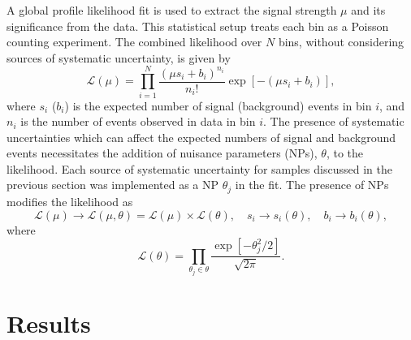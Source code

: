 

A global profile likelihood fit is used to extract the signal strength $\mu$ and its significance from the data. This statistical setup treats each bin as a Poisson counting experiment. The combined likelihood over $N$ bins, without considering sources of systematic uncertainty, is given by
%
\begin{equation}
    \mathcal{L}(\mu) = \prod_{i=1}^N \frac{(\mu s_i + b_i)^{n_i}}{n_i!} \exp \left[ - (\mu s_i + b_i) \right],
\end{equation}
%
where $s_i$ ($b_i$) is the expected number of signal (background) events in bin $i$, and $n_i$ is the number of events observed in data in bin $i$. The presence of systematic uncertainties which can affect the expected numbers of signal and background events necessitates the addition of nuisance parameters (NPs), $\theta$, to the likelihood. Each source of systematic uncertainty for \Vjets samples discussed in the previous section was implemented as a NP $\theta_j$ in the fit. The presence of NPs modifies the likelihood as 
%
\begin{equation}
    \mathcal{L}(\mu) \rightarrow \mathcal{L}(\mu, \theta) = \mathcal{L}(\mu) \times \mathcal{L}(\theta) , \quad s_i \rightarrow s_i(\theta) , \quad b_i \rightarrow b_i(\theta),
\end{equation}
%
where
%
\begin{equation}
    \mathcal{L}(\theta) = \prod_{\theta_j \in \theta} \frac{\exp\left[{-\theta_j^2/2}\right]}{\sqrt{2\pi}}.
\end{equation}
%


\section{Results}\label{sec:vhbb_results}

